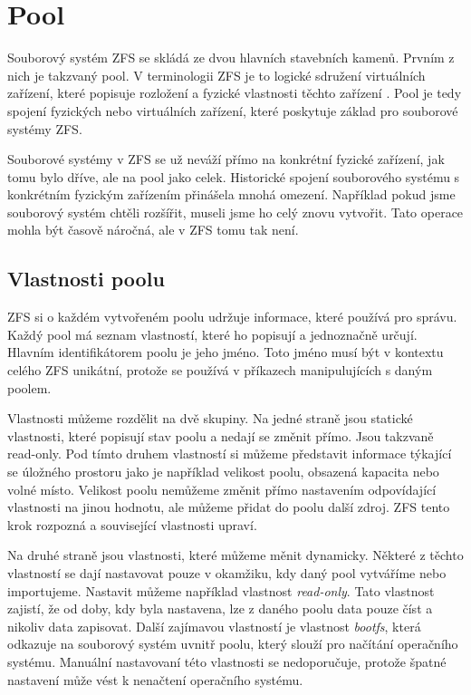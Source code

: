 \section{Pool}
Souborový systém ZFS se skládá ze dvou hlavních stavebních kamenů. Prvním z nich je takzvaný pool. V terminologii ZFS je to logické sdružení virtuálních zařízení, které popisuje rozložení a fyzické vlastnosti těchto zařízení \cite{terminology}. Pool je tedy spojení fyzických nebo virtuálních zařízení, které poskytuje základ pro souborové systémy ZFS.

Souborové systémy v ZFS se už neváží přímo na konkrétní fyzické zařízení, jak tomu bylo dříve, ale na pool jako celek. Historické spojení souborového systému s konkrétním fyzickým zařízením přinášela mnohá omezení. Například pokud jsme souborový systém chtěli rozšířit, museli jsme ho celý znovu vytvořit. Tato operace mohla být časově náročná, ale v ZFS tomu tak není.
\subsection{Vlastnosti poolu}
ZFS si o každém vytvořeném poolu udržuje informace, které používá pro správu. Každý pool má seznam vlastností, které ho popisují a jednoznačně určují.
Hlavním identifikátorem poolu je jeho jméno. Toto jméno musí být v kontextu celého ZFS unikátní, protože se používá v příkazech manipulujících s daným poolem.

Vlastnosti můžeme rozdělit na dvě skupiny. Na jedné straně jsou statické vlastnosti, které popisují stav poolu a nedají se změnit přímo. Jsou takzvaně read-only. Pod tímto druhem vlastností si můžeme představit informace týkající se úložného prostoru jako je například velikost poolu, obsazená kapacita nebo volné místo. Velikost poolu nemůžeme změnit přímo nastavením odpovídající vlastnosti na jinou hodnotu, ale můžeme přidat do poolu další zdroj. ZFS tento krok rozpozná a související vlastnosti upraví.

Na druhé straně jsou vlastnosti, které můžeme měnit dynamicky. Některé z těchto vlastností se dají nastavovat pouze v okamžiku, kdy daný pool vytváříme nebo importujeme. Nastavit můžeme například vlastnost \emph{read-only}. Tato vlastnost zajistí, že od doby, kdy byla nastavena, lze z daného poolu data pouze číst a nikoliv data zapisovat. Další zajímavou vlastností je vlastnost \emph{bootfs}, která odkazuje na souborový systém uvnitř poolu, který slouží pro načítání operačního systému. Manuální nastavovaní této vlastnosti se nedoporučuje, protože špatné nastavení může vést k nenačtení operačního systému.

